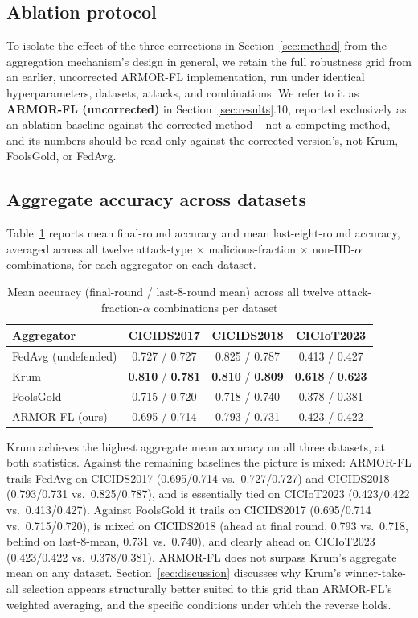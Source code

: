 \documentclass[pdflatex,iicol,sn-mathphys-num]{sn-jnl}%
\theoremstyle{thmstyleone}%
\theoremstyle{thmstyletwo}%
\theoremstyle{thmstylethree}%
\begin{document}
\subsection{Ablation protocol}\label{sec:ablation-protocol}

To isolate the effect of the three corrections in Section~\ref{sec:method} from the aggregation mechanism's design in general, we retain the full robustness grid from an earlier, uncorrected ARMOR-FL implementation, run under identical hyperparameters, datasets, attacks, and combinations. We refer to it as \textbf{ARMOR-FL (uncorrected)} in Section~\ref{sec:results}.10, reported exclusively as an ablation baseline against the corrected method -- not a competing method, and its numbers should be read only against the corrected version's, not Krum, FoolsGold, or FedAvg.

\subsection{Aggregate accuracy across datasets}

Table~\ref{tab:master} reports mean final-round accuracy and mean last-eight-round accuracy, averaged across all twelve attack-type $\times$ malicious-fraction $\times$ non-IID-$\alpha$ combinations, for each aggregator on each dataset.

\begin{table}[htbp]
\centering
\caption{Mean accuracy (final-round / last-8-round mean) across all twelve attack-fraction-$\alpha$ combinations per dataset}\label{tab:master}
\footnotesize
\begin{tabular}{@{}lccc@{}}
\toprule
Aggregator & CICIDS2017 & CICIDS2018 & CICIoT2023 \\
\midrule
FedAvg (undefended) & 0.727 / 0.727 & 0.825 / 0.787 & 0.413 / 0.427 \\
Krum & \textbf{0.810} / \textbf{0.781} & \textbf{0.810} / \textbf{0.809} & \textbf{0.618} / \textbf{0.623} \\
FoolsGold & 0.715 / 0.720 & 0.718 / 0.740 & 0.378 / 0.381 \\
ARMOR-FL (ours) & 0.695 / 0.714 & 0.793 / 0.731 & 0.423 / 0.422 \\
\bottomrule
\end{tabular}
\end{table}

Krum achieves the highest aggregate mean accuracy on all three datasets, at both statistics. Against the remaining baselines the picture is mixed: ARMOR-FL trails FedAvg on CICIDS2017 (0.695/0.714 vs.\ 0.727/0.727) and CICIDS2018 (0.793/0.731 vs.\ 0.825/0.787), and is essentially tied on CICIoT2023 (0.423/0.422 vs.\ 0.413/0.427). Against FoolsGold it trails on CICIDS2017 (0.695/0.714 vs.\ 0.715/0.720), is mixed on CICIDS2018 (ahead at final round, 0.793 vs.\ 0.718, behind on last-8-mean, 0.731 vs.\ 0.740), and clearly ahead on CICIoT2023 (0.423/0.422 vs.\ 0.378/0.381). ARMOR-FL does not surpass Krum's aggregate mean on any dataset. Section~\ref{sec:discussion} discusses why Krum's winner-take-all selection appears structurally better suited to this grid than ARMOR-FL's weighted averaging, and the specific conditions under which the reverse holds.
\end{document}
